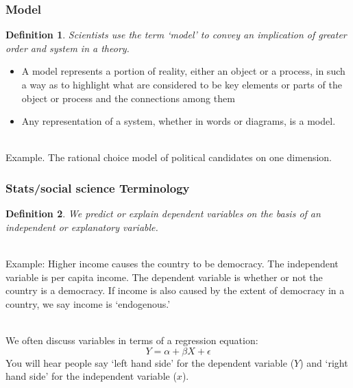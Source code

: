\documentclass[aspectratio=169]{beamer}
\newtheorem{defn}{Definition}
\numberwithin{equation}{section}
\begin{document}
\begin{frame}
\frametitle{Model}

\begin{defn}
Scientists use the term `model' to convey an implication of greater order and system in a theory.
\end{defn} \pause

\begin{itemize}
\item A model represents a portion of reality, either an object or a process, in such a way as to highlight what are considered to be key elements or parts of the object or process and the connections among them
\item Any representation of a system, whether in words or diagrams, is a model.
\end{itemize}\pause

\ \\Example. The rational choice model of political candidates on one dimension.

\end{frame}



\begin{frame}
\frametitle{Stats/social science Terminology}

\begin{defn}
We predict or explain dependent variables on the basis of an independent or explanatory variable.  
\end{defn} \pause

\ \\Example: Higher income causes the country to be democracy. The independent variable is per capita income. The dependent variable is whether or not the country is a democracy.\pause
If income is also caused by the extent of democracy in a country, we say income is `endogenous.'\pause

\ \\We often discuss variables in terms of a regression equation:
$$Y = \alpha +\beta X +\epsilon$$
You will hear people say `left hand side' for the dependent variable ($Y$) and `right hand side' for the independent variable ($x$). 

\end{frame}
\end{document}
